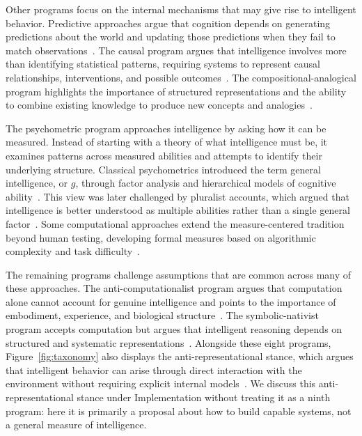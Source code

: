 \documentclass[acmsmall,screen,review,anonymous]{acmart}
\begin{document}
Other programs focus on the internal mechanisms that may give rise to intelligent behavior. 
%
Predictive approaches argue that cognition depends on generating predictions about the world and updating those predictions when they fail to match observations~\citep{friston2010, clark2013, hawkins2004, lecun2022}. 
%
The causal program argues that intelligence involves more than identifying statistical patterns, requiring systems to represent causal relationships, interventions, and possible outcomes~\citep{pearl2009, scholkopf2021}. 
%
The compositional-analogical program highlights the importance of structured representations and the ability to combine existing knowledge to produce new concepts and analogies~\citep{hofstadter2001, lake2017}.

The psychometric program approaches intelligence by asking how it can be measured. 
%
Instead of starting with a theory of what intelligence must be, it examines patterns across measured abilities and attempts to identify their underlying structure. 
%
Classical psychometrics introduced the term general intelligence, or $g$, through factor analysis and hierarchical models of cognitive ability~\citep{spearman1904}. 
%
This view was later challenged by pluralist accounts, which argued that intelligence is better understood as multiple abilities rather than a single general factor~\citep{gardner1983}. 
%
Some computational approaches extend the measure-centered tradition beyond human testing, developing formal measures based on algorithmic complexity and task difficulty~\citep{hernandezorallo2017, chollet2019measureintelligence}.

The remaining programs challenge assumptions that are common across many of these approaches. 
%
The anti-computationalist program argues that computation alone cannot account for genuine intelligence and points to the importance of embodiment, experience, and biological structure~\citep{searle1980, dreyfus1972}. 
%
The symbolic-nativist program accepts computation but argues that intelligent reasoning depends on structured and systematic representations~\citep{newellsimon1976, chomsky1959, fodorpylyshyn1988, marcus2020}. 
%
Alongside these eight programs, Figure~\ref{fig:taxonomy} also displays the anti-representational stance, which argues that intelligent behavior can arise through direct interaction with the environment without requiring explicit internal models~\citep{brooks1991}.
%
We discuss this anti-representational stance under Implementation without treating it as a ninth program: here it is primarily a proposal about how to build capable systems, not a general measure of intelligence.
\end{document}
